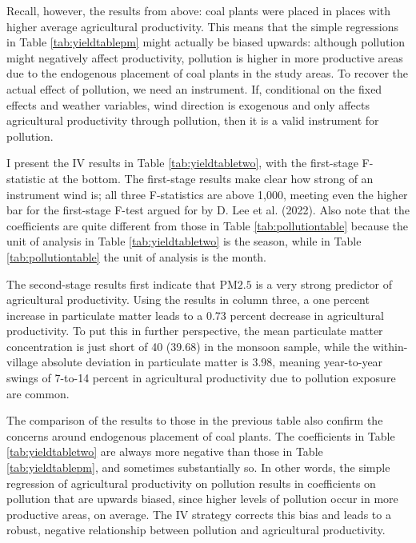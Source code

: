\documentclass[
]{article}
\begin{document}
Recall, however, the results from above: coal plants were placed in places with higher average agricultural productivity. This means that the simple regressions in Table \ref{tab:yieldtablepm} might actually be biased upwards: although pollution might negatively affect productivity, pollution is higher in more productive areas due to the endogenous placement of coal plants in the study areas. To recover the actual effect of pollution, we need an instrument. If, conditional on the fixed effects and weather variables, wind direction is exogenous and only affects agricultural productivity through pollution, then it is a valid instrument for pollution.

I present the IV results in Table \ref{tab:yieldtabletwo}, with the first-stage F-statistic at the bottom. The first-stage results make clear how strong of an instrument wind is; all three F-statistics are above 1,000, meeting even the higher bar for the first-stage F-test argued for by D. Lee et al. (2022). Also note that the coefficients are quite different from those in Table \ref{tab:pollutiontable} because the unit of analysis in Table \ref{tab:yieldtabletwo} is the season, while in Table \ref{tab:pollutiontable} the unit of analysis is the month.

The second-stage results first indicate that \(\mathrm{PM 2.5}\) is a very strong predictor of agricultural productivity. Using the results in column three, a one percent increase in particulate matter leads to a 0.73 percent decrease in agricultural productivity. To put this in further perspective, the mean particulate matter concentration is just short of 40 (39.68) in the monsoon sample, while the within-village absolute deviation in particulate matter is 3.98, meaning year-to-year swings of 7-to-14 percent in agricultural productivity due to pollution exposure are common.

The comparison of the results to those in the previous table also confirm the concerns around endogenous placement of coal plants. The coefficients in Table \ref{tab:yieldtabletwo} are always more negative than those in Table \ref{tab:yieldtablepm}, and sometimes substantially so. In other words, the simple regression of agricultural productivity on pollution results in coefficients on pollution that are upwards biased, since higher levels of pollution occur in more productive areas, on average. The IV strategy corrects this bias and leads to a robust, negative relationship between pollution and agricultural productivity.
\end{document}
